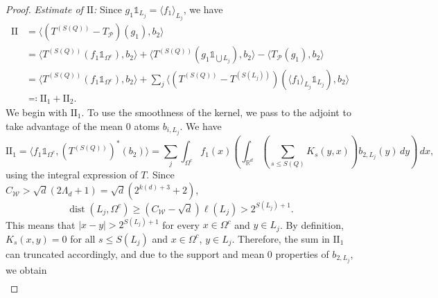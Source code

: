 \documentclass[12pt]{amsart}
\newcommand{\R}{\mathbb{R}}
\newcommand{\dist}[1]{\operatorname{dist}\left(#1\right) }
\newcommand{\one}{\mathds{1}}
\theoremstyle{plain}
\theoremstyle{definition} %
\numberwithin{equation}{section}
\begin{document}
\begin{proof}
\noindent \textit{Estimate of $\mathrm{II}$:} Since $g_1\one_{L_j}=\langle f_1\rangle_{L_j}$, we have
    \begin{align*}
        \mathrm{II}
        &=
        \langle (T^{(S(Q))}-T_{\mathcal{P}})(g_1),b_2\rangle 
        \\&=
        \langle T^{(S(Q))}(f_1\one_{\Omega^{c}}),b_2\rangle 
        +
        \langle T^{(S(Q))}(g_1\one_{\bigcup L_j}),b_2\rangle 
        -
        \langle T_{\mathcal{P}}(g_1),b_2\rangle
        \\&=
        \langle T^{(S(Q))}(f_1\one_{\Omega^{c}}),b_2\rangle 
        +
        \sum_{j}\langle (T^{(S(Q))}-T^{(S(L_j))})(\langle f_1\rangle_{L_j}\one_{L_j}),b_2\rangle
        \\&\eqqcolon 
        \mathrm{II}_1+\mathrm{II}_2.
    \end{align*}
    We begin with $\mathrm{II}_1$. To use the smoothness of the kernel, we pass to the adjoint to take advantage of the mean $0$ atoms $b_{i,L_j}$. We have 
    \[
    \mathrm{II}_1
    =
    \langle f_1\one_{\Omega^{c}},(T^{(S(Q))})^{\ast}(b_2)\rangle 
    =
    \sum_{j}\int_{\Omega^c}f_1(x)\left(\int_{\R^d}\left(\sum_{s\leq S(Q)}K_s(y,x)\right)b_{2,L_j}(y)\, dy\right)\, dx,
    \]
    using the integral expression of $T$. Since $C_{\mathcal{W}}>\sqrt{d}(2\Lambda_d+1)=\sqrt{d}(2^{k(d)+3}+2)$, 
        \[
        \dist{L_j,\Omega^c}\geq (C_{\mathcal{W}}-\sqrt{d})\ell(L_j)>2^{S(L_j)+1}.
        \]
        This means that $|x-y|>2^{S(L_j)+1}$ for every $x\in\Omega^c$ and $y\in L_j$. By definition, $K_s(x,y)=0$ for all $s\leq S(L_j)$ and $ x\in\Omega^c$, $y\in L_j$. Therefore, the sum in $\mathrm{II}_1$ can truncated accordingly, and due to the support and mean $0$ properties of $b_{2,L_j}$, we obtain
        \begin{align}\label{estimateII1_formula1}

\end{align}
\end{proof}
\end{document}
